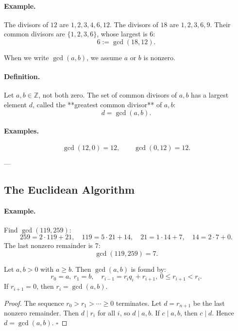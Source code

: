 \paragraph{Example.}
The divisors of \(12\) are \(1, 2, 3, 4, 6, 12\).  
The divisors of \(18\) are \(1, 2, 3, 6, 9\).  
Their common divisors are \(\{1,2,3,6\}\), whose largest is 6:
\[
6 := \gcd(18, 12).
\]

\begin{remark}
When we write \(\gcd(a,b)\), we assume \(a\) or \(b\) is nonzero.
\end{remark}

\paragraph{Definition.}
Let \(a,b \in \mathbb{Z}\), not both zero.  
The set of common divisors of \(a,b\) has a largest element \(d\), called the **greatest common divisor** of \(a,b\):
\[
d = \gcd(a,b).
\]

\paragraph{Examples.}
\[
\gcd(12,0)=12, \qquad \gcd(0,12)=12.
\]

---

\subsection{The Euclidean Algorithm}

\paragraph{Example.}
Find \(\gcd(119,259)\):
\[
259 = 2\cdot119 + 21, \quad 119 = 5\cdot21 + 14, \quad 21 = 1\cdot14 + 7, \quad 14 = 2\cdot7 + 0.
\]
The last nonzero remainder is 7:
\[
\boxed{\gcd(119,259)=7.}
\]

\begin{theorem}
Let \(a,b>0\) with \(a\ge b\).  
Then \(\gcd(a,b)\) is found by:
\[
r_0=a, \ r_1=b, \quad r_{i-1}=r_i q_i + r_{i+1}, \ 0\le r_{i+1}<r_i.
\]
If \(r_{i+1}=0\), then \(r_i=\gcd(a,b)\).
\end{theorem}

\begin{proof}
The sequence \(r_0>r_1>\cdots\ge0\) terminates.  
Let \(d=r_{n+1}\) be the last nonzero remainder.  
Then \(d\mid r_i\) for all \(i\), so \(d\mid a,b\).  
If \(c\mid a,b\), then \(c\mid d\).  
Hence \(d=\gcd(a,b)\).  
\hfill\(\square\)
\end{proof}

